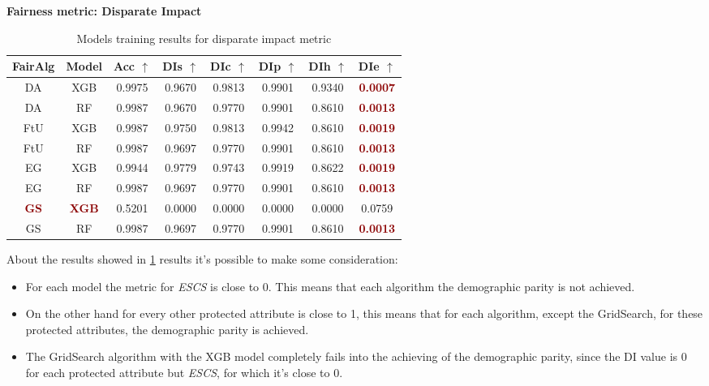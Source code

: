 \textbf{Fairness metric: Disparate Impact}

\begin{table}
    \centering
    \begin{tabular}{|c|c|c|c|c|c|c|c|}
        \hline
        \textbf{FairAlg} & \textbf{Model} & \textbf{Acc} $\uparrow$ & \textbf{DIs} $\uparrow$ & \textbf{DIc} $\uparrow$ & \textbf{DIp} $\uparrow$ & \textbf{DIh} $\uparrow$ & \textbf{DIe} $\uparrow$ \\
        \hline
        DA & XGB & 0.9975 & 0.9670 & 0.9813 & 0.9901 & 0.9340 & \textcolor{darkred}{\textbf{0.0007}} \\
        \hline
        DA & RF & 0.9987 & 0.9670 & 0.9770 & 0.9901 & 0.8610 & \textcolor{darkred}{\textbf{0.0013}} \\
        \hline
        FtU & XGB & 0.9987 & 0.9750 & 0.9813 & 0.9942 & 0.8610 & \textcolor{darkred}{\textbf{0.0019}} \\
        \hline
        FtU & RF & 0.9987 & 0.9697 & 0.9770 & 0.9901 & 0.8610 & \textcolor{darkred}{\textbf{0.0013}} \\
        \hline
        EG & XGB & 0.9944 & 0.9779 & 0.9743 & 0.9919 & 0.8622 & \textcolor{darkred}{\textbf{0.0019}} \\
        \hline
        EG & RF & 0.9987 & 0.9697 & 0.9770 & 0.9901 & 0.8610 & \textcolor{darkred}{\textbf{0.0013}} \\
        \hline
        \textcolor{darkred}{\textbf{GS}} & \textcolor{darkred}{\textbf{XGB}} & 0.5201 & 0.0000 & 0.0000 & 0.0000 & 0.0000 & 0.0759 \\
        \hline
        GS & RF & 0.9987 & 0.9697 & 0.9770 & 0.9901 & 0.8610 & \textcolor{darkred}{\textbf{0.0013}} \\
        \hline
    \end{tabular}
    \caption{Models training results for disparate impact metric}
    \label{tab:results_di}
\end{table}

About the results showed in \cref{tab:results_di} results it's possible to make some consideration:

\begin{itemize}

    \item For each model the metric for \emph{ESCS} is close to 0. This means that each algorithm the demographic parity is not achieved.

    \item On the other hand for every other protected attribute is close to 1, this means that for each algorithm, except the GridSearch, for these protected attributes, the demographic parity is achieved.

    \item The GridSearch algorithm with the XGB model completely fails into the achieving of the demographic parity, since the DI value is 0 for each protected attribute but \emph{ESCS}, for which it's close to 0.
    
\end{itemize}

